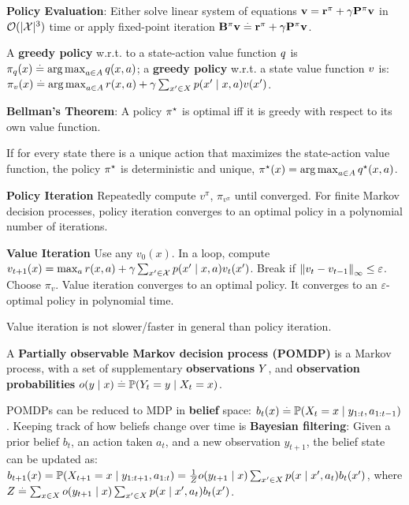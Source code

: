 \begin{framed}
    \textbf{Policy Evaluation}:
    Either solve linear system of equations $\mathbf{v} = \mathbf{r}^\pi + \gamma \mathbf{P}^\pi \mathbf{v}$ in \(\mathcal{O}(|\mathcal{X}|^3)\) time or apply fixed-point iteration $\mathbf{B}^\pi \mathbf{v} \overset{.}{=} \mathbf{r}^\pi + \gamma \mathbf{P}^\pi \mathbf{v}$.
\end{framed}
\begin{framed}
    A \textbf{greedy policy} w.r.t. to a state-action value function $\fnq$ is $\pi_{\fnq}(x) \defeq \argmax_{a \in \sA} \q{x}{a}$; a \textbf{greedy policy} w.r.t. a state value function $\fnv$ is: $\pi_{\fnv}(x) \defeq \argmax_{a \in \sA} r(x, a) + \gamma \sum_{x' \in \sX} p(x' \mid x, a) \v{x'}$.
\end{framed}
\begin{framed}
    \textbf{Bellman's Theorem}: A policy $\pi^\star$ is optimal iff it is greedy with respect to its own value function. 
\end{framed}
If for every state there is a unique action that maximizes the state-action value function, the policy $\pi^\star$ is deterministic and unique, $\pis(x) = \argmax_{a \in \sA} \q*{x}{a}$. 
\begin{framed}
    \textbf{Policy Iteration}
    Repeatedly compute \(v^{\pi}\), \(\pi _{v^{\pi}}\) until converged. For finite Markov decision processes, policy iteration converges to an optimal policy in a polynomial number of iterations.
\end{framed}
\begin{framed}
    \textbf{Value Iteration}
    Use any \(v_0(x)\). In a loop, compute  \(v_{t+1}(x)=\max_a r(x,a)+\gamma \sum_{x'\in \mathcal{X}}{p(x'\mid x,a)v_t(x')}\). Break if \(\norm{v_t-v_{t-1}}_{\infty} \leq \varepsilon \). Choose \(\pi_v\).
Value iteration converges to an optimal policy. It converges to an \(\varepsilon\)-optimal policy in polynomial time.
\end{framed}
Value iteration is not slower/faster in general than policy iteration.
\begin{framed}
    A \textbf{Partially observable Markov decision process (POMDP)} is a Markov process, with a set of supplementary \textbf{observations} $Y$, and \textbf{observation probabilities} $o(y \mid x) \defeq \Pr{Y_t = y \mid X_t = x}$.
\end{framed}
POMDPs can be reduced to MDP in \textbf{belief} space: $b_t(x) \defeq \Pr{X_t = x \mid y_{1:t}, a_{1:t-1}}$. Keeping track of how beliefs change over time is \textbf{Bayesian filtering}: Given a prior belief $b_t$, an action taken $a_t$, and a new observation $y_{t+1}$, the belief state can be updated as: $b_{t+1}(x) = \Pr{X_{t+1} = x \mid y_{1:t+1}, a_{1:t}} = \frac{1}{Z} o(y_{t+1} \mid x) \sum_{x' \in \sX} p(x \mid x', a_t) b_t(x')$, where $Z \overset{.}{=} \sum_{x \in X} o(y_{t+1} \mid x) \sum_{x' \in X} p(x \mid x', a_t) b_t(x')$.
